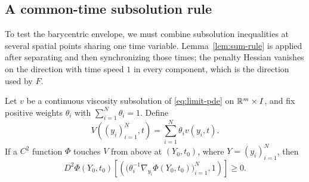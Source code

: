 \subsection{A common-time subsolution rule}

To test the barycentric envelope, we must combine subsolution inequalities
at several spatial points sharing one time variable. Lemma~\ref{lem:sum-rule} is
applied after separating and then synchronizing those times; the penalty
Hessian vanishes on the direction with time speed $1$ in every component,
which is the direction used by $F$.

\begin{lemma}\label{lem:common-time-subsolution}
Let $v$ be a continuous viscosity subsolution of
\eqref{eq:limit-pde} on $\mathbb{R}^m\times I$, and fix positive weights
$\theta_i$ with $\sum_{i=1}^N\theta_i=1$. Define
\[
  V((y_i)_{i=1}^N,t)=\sum_{i=1}^N\theta_i v(y_i,t).
\]
If a $C^2$ function $\Phi$ touches $V$ from above at $(Y_0,t_0)$,
where $Y=(y_i)_{i=1}^N$, then
\begin{equation}\label{eq:common-time-inequality}
  D^2\Phi(Y_0,t_0)
   \left[\left(
       \bigl(\theta_i^{-1}\nabla_{y_i}\Phi(Y_0,t_0)\bigr)_{i=1}^N,
       1\right)\right]\ge0.
\end{equation}
\end{lemma}

